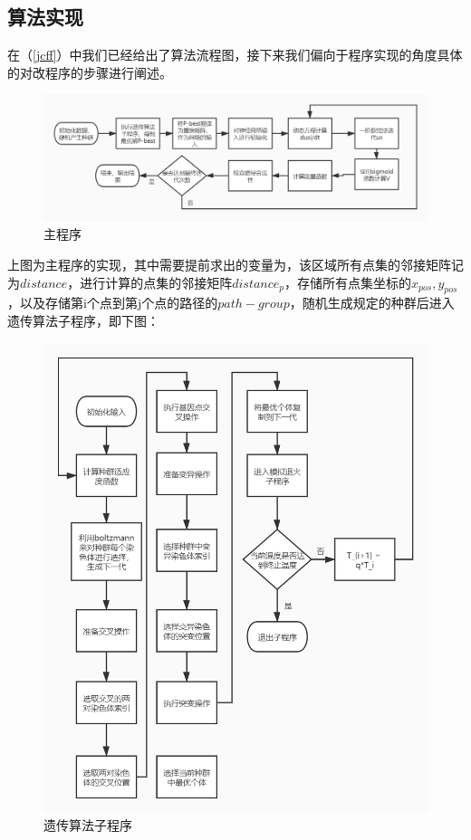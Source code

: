 \subsection{算法实现}
在（\ref{jcff}）中我们已经给出了算法流程图，接下来我们偏向于程序实现的角度具体的对改程序的步骤进行阐述。
\begin{figure}[H]
    \centering
    \includegraphics[width=13cm]{figure/main.jpg}%
    \caption{主程序}
    \label{fig:main}
\end{figure}
上图为主程序的实现，其中需要提前求出的变量为，该区域所有点集的邻接矩阵记为$distance$，进行计算的点集的邻接矩阵$distance_p$，存储所有点集坐标的$x_{pos},y_{pos}$，以及存储第i个点到第j个点的路径的$path-group$，随机生成规定的种群后进入遗传算法子程序，即下图：
\begin{figure}[H]
    \centering
    \includegraphics[width=13cm]{figure/main_GA.jpg}
    \caption{遗传算法子程序}
    \label{fig:main_GA}
\end{figure}
